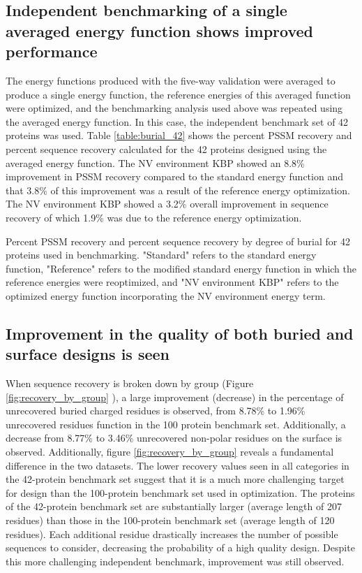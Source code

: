 \subsection{Independent benchmarking of a single averaged energy function shows improved performance}
The energy functions produced with the five-way validation were averaged to produce a single energy function, the reference energies of this averaged function were optimized, and the benchmarking analysis used above was repeated using the averaged energy function.
In this case, the independent benchmark set of 42 proteins was used.
Table \ref{table:burial_42} shows the percent \ac{PSSM} recovery and percent sequence recovery calculated for the 42 proteins designed using the averaged energy function.
The \ac{NV} environment \ac{KBP} showed an 8.8\% improvement in \ac{PSSM} recovery compared to the standard energy function and that 3.8\% of this improvement was a result of the reference energy optimization.
The \ac{NV} environment \ac{KBP} showed a 3.2\% overall improvement in sequence recovery of which 1.9\% was due to the reference energy optimization. 

\begin{table}
\scriptsize
\renewcommand{\tabcolsep}{0.09cm}
\centering

\caption{Percent \acs{PSSM} recovery and percent sequence recovery by degree of burial for 42 proteins used in benchmarking. 
"Standard" refers to the standard energy function, "Reference" refers to the modified standard energy function in which the reference energies were reoptimized, and "\acs{NV} environment \acs{KBP}" refers to the optimized energy function incorporating the NV environment energy term.}
\label{table:burial_42}
\end{table}

\subsection{Improvement in the quality of both buried and surface designs is seen}
When sequence recovery is broken down by group (Figure \ref{fig:recovery_by_group} ), a large improvement (decrease) in the percentage of unrecovered buried charged residues is observed, from 8.78\% to 1.96\% unrecovered residues function in the 100 protein benchmark set.
Additionally, a decrease from 8.77\% to 3.46\% unrecovered non-polar residues on the surface is observed.
Additionally, figure \ref{fig:recovery_by_group} reveals a fundamental difference in the two datasets.
The lower recovery values seen in all categories in the 42-protein benchmark set suggest that it is a much more challenging target for design than the 100-protein benchmark set used in optimization.
The proteins of the 42-protein benchmark set are substantially larger (average length of 207 residues) than those in the 100-protein benchmark set (average length of 120 residues).
Each additional residue drastically increases the number of possible sequences to consider, decreasing the probability of a high quality design.
Despite this more challenging independent benchmark, improvement was still observed. 

